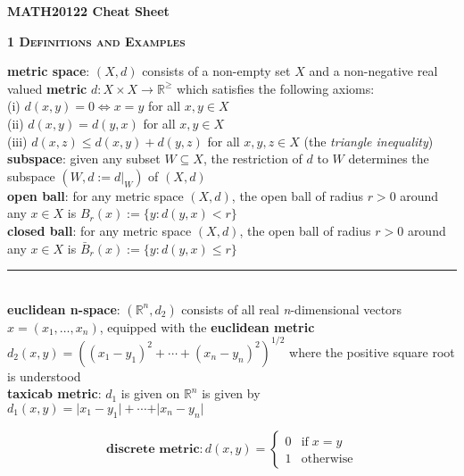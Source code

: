 \documentclass[a4paper]{article}
\newcommand*\abs[1]{\vert #1 \vert}
\newcommand*\linesep[0]{\noindent\rule{\textwidth}{0.5pt}\\}
\begin{document}

\begin{center}
	\huge{\textbf{MATH20122 Cheat Sheet}}\\
\end{center}

\begin{multicols}{2}
\begin{framed}
	\begin{center}
		\textbf{\textsc{1 Definitions and Examples}}
	\end{center}
	\textbf{metric space}: $(X, d)$ consists of a non-empty set $X$ and a non-negative real valued \textbf{metric} $d: X \times X \rightarrow \mathbb{R}^\geq$ which satisfies the following axioms:\\
	\noindent
	(i) $d(x, y) = 0 \iff x = y$ for all $x, y \in X$\\
	(ii) $d(x, y) = d(y, x)$ for all $x, y \in X$\\
	(iii) $d(x, z) \leq d(x, y) + d(y, z)$ for all $x, y, z \in X$ (the \textit{triangle inequality})\\
	
	\noindent
	\textbf{subspace}: given any subset $W \subseteq X$, the restriction of $d$ to $W$ determines the subspace $(W, d := d\vert_W)$ of $(X, d)$\\
	
	\noindent
 	\textbf{open ball}: for any metric space $(X, d)$, the open ball of radius $r > 0$ around any $x \in X$ is $B_r(x) := \{y : d(y, x) < r\}$\\
 	
 	\noindent
 	\textbf{closed ball}: for any metric space $(X, d)$, the open ball of radius $r > 0$ around any $x \in X$ is $\bar{B}_r(x) := \{y : d(y, x) \leq r\}$
 	
 	\linesep
 	\noindent
 	\textbf{euclidean n-space}: $(\mathbb{R}^n, d_2)$ consists of all real \textit{n}-dimensional vectors $x = (x_1, \dots, x_n)$, equipped with the \textbf{euclidean metric} $d_2(x, y) = ((x_1 - y_1)^2 + \cdots + (x_n - y_n)^2)^{1/2}$ where the positive square root is understood\\
 	
 	\noindent
 	\textbf{taxicab metric}: $d_1$ is given on $\mathbb{R}^n$ is given by $d_1(x, y) = \abs{x_1 - y_1} + \cdots + \abs{x_n - y_n}$
 	
 	\[ \textbf{discrete metric}: d(x, y) = \begin{cases} 
      0 & \text{if} \; x = y \\
      1 & \text{otherwise}
      \end{cases}
	\]
 	

\end{framed}
\end{multicols}
\end{document}
